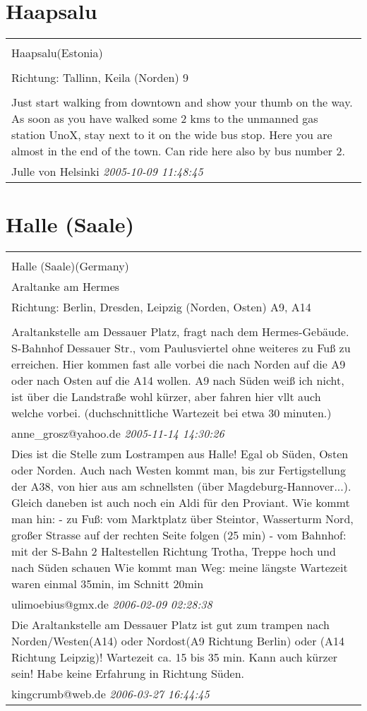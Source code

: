 \documentclass[a4paper,12pt]{article}
\begin{document}
\section{Haapsalu}
\begin{tabular}{|p{13cm}|}
\hline\\
Haapsalu(Estonia)\\
\\
Richtung: Tallinn, Keila (Norden) 9 \\
\hline\\
Just start walking from downtown and show your thumb on the way. As soon as you have walked some 2 kms to the unmanned gas station UnoX, stay next to it on the wide bus stop. Here you are almost in the end of the town. Can ride here also by bus number 2. \\
Julle von Helsinki \textit{ 2005-10-09 11:48:45 }\\\hline
\end{tabular}


\section{Halle (Saale)}
\begin{tabular}{|p{13cm}|}
\hline\\
Halle (Saale)(Germany)\\
Araltanke am Hermes\\
Richtung: Berlin, Dresden, Leipzig (Norden, Osten) A9, A14 \\
\hline\\
Araltankstelle am Dessauer Platz, fragt nach dem Hermes-Gebäude.
S-Bahnhof Dessauer Str., vom Paulusviertel ohne weiteres zu Fuß zu erreichen.
Hier kommen fast alle vorbei die nach Norden auf die A9 oder nach Osten auf die A14 wollen. A9 nach Süden weiß ich nicht, ist über die Landstraße wohl kürzer, aber fahren hier vllt auch welche vorbei. (duchschnittliche Wartezeit bei etwa 30 minuten.) \\
anne\_grosz@yahoo.de \textit{ 2005-11-14 14:30:26 }\\\hline Dies ist die Stelle zum Lostrampen aus Halle! Egal ob Süden, Osten oder Norden. Auch nach Westen kommt man, bis zur Fertigstellung der A38, von hier aus am schnellsten (über Magdeburg-Hannover...). Gleich daneben ist auch noch ein Aldi für den Proviant.
Wie kommt man hin:
- zu Fuß: vom Marktplatz über Steintor, Wasserturm Nord, großer Strasse auf der rechten Seite folgen (25 min)
- vom Bahnhof: mit der S-Bahn 2 Haltestellen Richtung Trotha, Treppe hoch und nach Süden schauen
Wie kommt man Weg: meine längste Wartezeit waren einmal 35min, im Schnitt 20min \\
ulimoebius@gmx.de \textit{ 2006-02-09 02:28:38 }\\\hline Die Araltankstelle am Dessauer Platz ist gut zum trampen nach Norden/Westen(A14) oder Nordost(A9 Richtung Berlin) oder (A14 Richtung Leipzig)! Wartezeit ca. 15 bis 35 min. Kann auch kürzer sein!
Habe keine Erfahrung in Richtung Süden. \\
kingcrumb@web.de \textit{ 2006-03-27 16:44:45 }\\\hline
\end{tabular}
\end{document}
